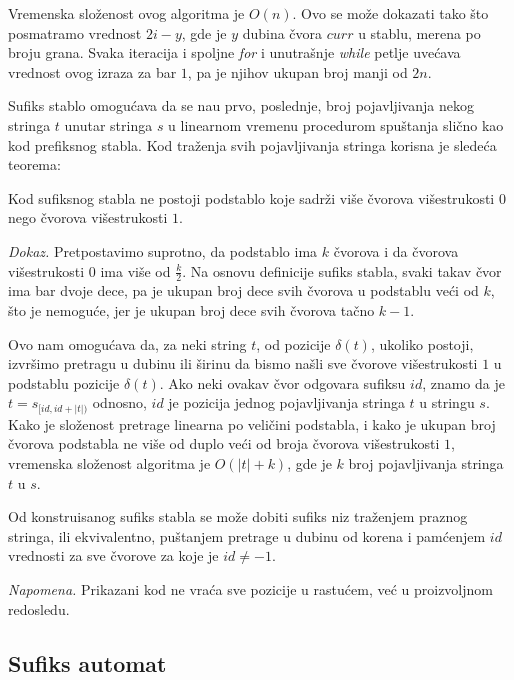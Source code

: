 \noindent
\begin{minipage}[l]{\textwidth}

\end{minipage}

Vremenska slo\v zenost ovog algoritma je $O(n)$. Ovo se mo\v ze dokazati tako \v sto posmatramo vrednost $2i-y$, gde je $y$ dubina \v cvora $curr$ u stablu, merena po broju grana. Svaka iteracija i spoljne \textit{for} i unutra\v snje \textit{while} petlje uve\' cava vrednost ovog izraza za bar $1$, pa je njihov ukupan broj manji od $2n$.

Sufiks stablo omogu\' cava da se na\dj u prvo, poslednje, broj pojavljivanja nekog stringa $t$ unutar stringa $s$ u linearnom vremenu procedurom spu\v stanja sli\v cno kao kod prefiksnog stabla. Kod tra\v zenja svih pojavljivanja stringa korisna je slede\' ca teorema:

\begin{thm}
Kod sufiksnog stabla ne postoji podstablo koje sadr\v zi vi\v se \v cvorova vi\v sestrukosti $0$ nego \v cvorova vi\v sestrukosti $1$.
\end{thm}

\textit{Dokaz.} Pretpostavimo suprotno, da podstablo ima $k$ \v cvorova i da \v cvorova vi\v sestrukosti $0$ ima vi\v se od $\frac{k}{2}$. Na osnovu definicije sufiks stabla, svaki takav \v cvor ima bar dvoje dece, pa je ukupan broj dece svih \v cvorova u podstablu ve\' ci od $k$, \v sto je nemogu\' ce, jer je ukupan broj dece svih \v cvorova ta\v cno $k-1$.

Ovo nam omogu\' cava da, za neki string $t$, od pozicije $\delta(t)$, ukoliko postoji, izvr\v simo pretragu u dubinu ili \v sirinu da bismo na\v sli sve \v cvorove vi\v sestrukosti $1$ u podstablu pozicije $\delta(t)$. Ako neki ovakav \v cvor odgovara sufiksu $id$, znamo da je $t = s_{[id, id+|t|)}$ odnosno, $id$ je pozicija jednog pojavljivanja stringa $t$ u stringu $s$. Kako je slo\v zenost pretrage linearna po veli\v cini podstabla, i kako je ukupan broj \v cvorova podstabla ne vi\v se od duplo ve\' ci od broja \v cvorova vi\v sestrukosti $1$, vremenska slo\v zenost algoritma je $O(|t|+k)$, gde je $k$ broj pojavljivanja stringa $t$ u $s$.

Od konstruisanog sufiks stabla se mo\v ze dobiti sufiks niz tra\v zenjem praznog stringa, ili ekvivalentno, pu\v stanjem pretrage u dubinu od korena i pam\' cenjem $id$ vrednosti za sve \v cvorove za koje je $id \not = -1$.

\noindent
\begin{minipage}[l]{\textwidth}

\end{minipage}

\textit{Napomena.} Prikazani kod ne vra\' ca sve pozicije u rastu\' cem, ve\' c u proizvoljnom redosledu.

\subsection{Sufiks automat}
